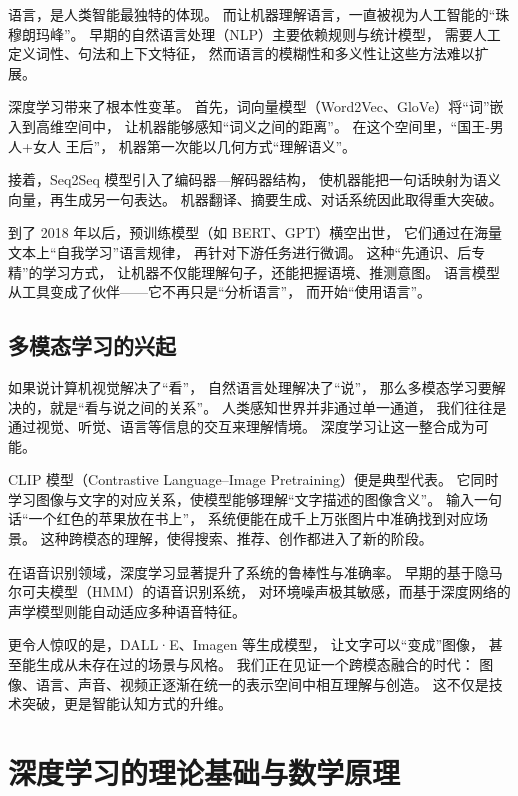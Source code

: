 语言，是人类智能最独特的体现。  
而让机器理解语言，一直被视为人工智能的“珠穆朗玛峰”。  
早期的自然语言处理（NLP）主要依赖规则与统计模型，  
需要人工定义词性、句法和上下文特征，  
然而语言的模糊性和多义性让这些方法难以扩展。  

深度学习带来了根本性变革。  
首先，词向量模型（Word2Vec、GloVe）将“词”嵌入到高维空间中，  
让机器能够感知“词义之间的距离”。  
在这个空间里，“国王-男人+女人 \approx 王后”，  
机器第一次能以几何方式“理解语义”。  

接着，Seq2Seq 模型引入了编码器—解码器结构，  
使机器能把一句话映射为语义向量，再生成另一句表达。  
机器翻译、摘要生成、对话系统因此取得重大突破。  

到了 2018 年以后，预训练模型（如 BERT、GPT）横空出世，  
它们通过在海量文本上“自我学习”语言规律，  
再针对下游任务进行微调。  
这种“先通识、后专精”的学习方式，  
让机器不仅能理解句子，还能把握语境、推测意图。  
语言模型从工具变成了伙伴——它不再只是“分析语言”，  
而开始“使用语言”。

\subsection{多模态学习的兴起}

如果说计算机视觉解决了“看”，  
自然语言处理解决了“说”，  
那么多模态学习要解决的，就是“看与说之间的关系”。  
人类感知世界并非通过单一通道，  
我们往往是通过视觉、听觉、语言等信息的交互来理解情境。  
深度学习让这一整合成为可能。  

CLIP 模型（Contrastive Language–Image Pretraining）便是典型代表。  
它同时学习图像与文字的对应关系，使模型能够理解“文字描述的图像含义”。  
输入一句话“一个红色的苹果放在书上”，  
系统便能在成千上万张图片中准确找到对应场景。  
这种跨模态的理解，使得搜索、推荐、创作都进入了新的阶段。  

在语音识别领域，深度学习显著提升了系统的鲁棒性与准确率。  
早期的基于隐马尔可夫模型（HMM）的语音识别系统，  
对环境噪声极其敏感，而基于深度网络的声学模型则能自动适应多种语音特征。  

更令人惊叹的是，DALL·E、Imagen 等生成模型，  
让文字可以“变成”图像，  
甚至能生成从未存在过的场景与风格。  
我们正在见证一个跨模态融合的时代：  
图像、语言、声音、视频正逐渐在统一的表示空间中相互理解与创造。  
这不仅是技术突破，更是智能认知方式的升维。

\section{深度学习的理论基础与数学原理}

